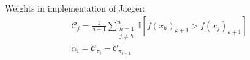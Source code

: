 Weights in implementation of Jaeger: 
\begin{align} %
    \mathcal{C}_j = %
    \frac{1}{n-1} 
    \sum_{\substack{h=1 \\ j \neq h}}^n \mathbb{I}[f(x_h)_{k+1} > f(x_j)_{k+1}] \\ %
    \alpha_i =  \mathcal{C}_{\pi_i} - \mathcal{C}_{\pi_{i+1}}     
\end{align}




\newpage
